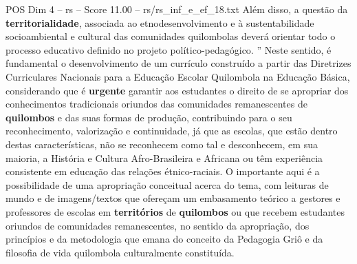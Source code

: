 \begin{textsample}{POS Dim 4 – rs – Score 11.00 – rs/rs\_inf\_e\_ef\_18.txt}
Além disso, a questão da \textbf{territorialidade}, associada ao etnodesenvolvimento e à sustentabilidade socioambiental e cultural das comunidades quilombolas deverá orientar todo o processo educativo definido no projeto político-pedagógico. ” Neste sentido, é fundamental o desenvolvimento de um currículo construído a partir das Diretrizes Curriculares Nacionais para a Educação Escolar Quilombola na Educação Básica, considerando que é \textbf{urgente} garantir aos estudantes o direito de se apropriar dos conhecimentos tradicionais oriundos das comunidades remanescentes de \textbf{quilombos} e das suas formas de produção, contribuindo para o seu reconhecimento, valorização e continuidade, já que as escolas, que estão dentro destas características, não se reconhecem como tal e desconhecem, em sua maioria, a História e Cultura Afro-Brasileira e Africana ou têm experiência consistente em educação das relações étnico-raciais.
O importante aqui é a possibilidade de uma apropriação conceitual acerca do tema, com leituras de mundo e de imagens/textos que ofereçam um embasamento teórico a gestores e professores de escolas em \textbf{territórios} de \textbf{quilombos} ou que recebem estudantes oriundos de comunidades remanescentes, no sentido da apropriação, dos princípios e da metodologia que emana do conceito da Pedagogia Griô e da filosofia de vida quilombola culturalmente constituída.

\end{textsample}
